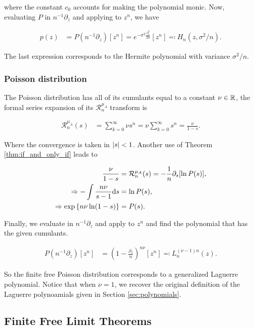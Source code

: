 \noindent where the constant $c_0$ accounts for making the polynomial monic. Now, evaluating $P$ in $n^{-1}\partial_z$ and applying to $z^n$, we have

\begin{align*}
    p(z) &= P(n^{-1}\partial_z)[z^n] = e^{-\sigma^2\frac{\partial_z^2}{2n}}[z^n] \eqcolon H_n(z,\sigma^2/n). 
\end{align*}

The last expression corresponds to the Hermite polynomial with variance $\sigma^2/n$.

\subsubsection{Poisson distribution}

The Poisson distribution has all of its cumulants equal to a constant $\nu \in \mathbb R$, the formal series expansion of its $\mathcal R_n^{\mu_A}$ transform is 

\begin{align*}
    \mathcal R_n^{\mu_A}(s) &= \sum_{k=0}^\infty \nu s^n = \nu \sum_{k=0}^\infty s^n = \frac{\nu}{1-s}.
\end{align*}

Where the convergence is taken in $\lvert s \rvert < 1$. Another use of Theorem \ref{thm:if_and_only_if} leads to

\begin{align*}
    \frac{\nu}{1-s} &= \mathcal R_n^{\mu_A}(s) = -\frac1n\partial_s[\ln P(s)], \\
    \Rightarrow -\int \frac{n\nu}{s-1} \mathrm d s &= \ln P(s),\\
    \Rightarrow \exp\left\{ n\nu \ln (1-s) \right\} &= P(s).
\end{align*}

Finally, we evaluate in $n^{-1}\partial_z$ and apply to $z^n$ and find the polynomial that has the given cumulants.

\begin{align} \label{eq:ff_poisson}
    P(n^{-1}\partial_z)[z^n] &= \left( 1 - \frac{\partial_z}{n} \right)^{n\nu}[z^n] \eqcolon L_n^{(\nu-1)n}(z).
\end{align}

So the finite free Poisson distribution corresponds to a generalized Laguerre polynomial. Notice that when $\nu=1$, we recover the original definition of the Laguerre polynoamials given in Section \ref{sec:polynomials}.

\subsection{Finite Free Limit Theorems}

